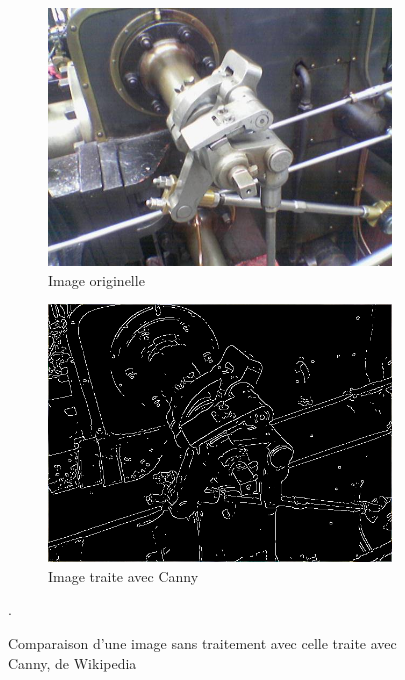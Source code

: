 \documentclass[a4paper, 12pt, titlepage, oneside, french]{article}
\begin{document}
	\begin{figure}[H] %
		\centering
		\begin{subfigure}[]{0.4\linewidth}%
			\includegraphics[width=\linewidth]{ValveOriginal.png}
			\caption{Image originelle}
		\end{subfigure}
		\begin{subfigure}[]{0.4\linewidth}
			\includegraphics[width=\linewidth]{ValveCanny.png}
			\caption{Image traite avec Canny}
		\end{subfigure}
		\caption{Comparaison d'une image sans traitement avec celle traite avec Canny, de Wikipedia \cite{WikiCannyOriginal}\cite{WikiCanny}}. 
		\label{fig:cannyGood}
	\end{figure}
\end{document}
